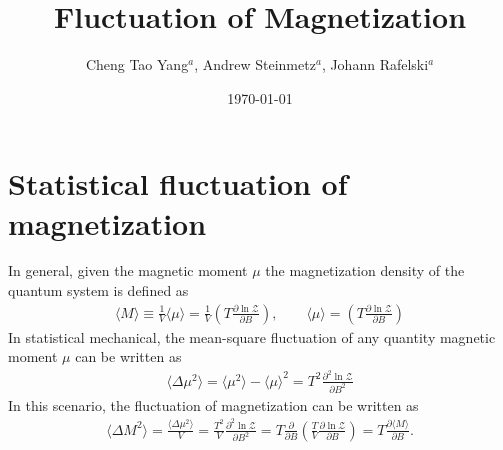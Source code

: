 \documentclass[onecolumn,preprintnumbers,amsmath,amssymb]{revtex4}
\begin{document}
\title{Fluctuation of Magnetization}
\author{Cheng Tao Yang$^a$,  Andrew Steinmetz$^a$, Johann Rafelski$^a$}
\date{\today}


\begin{abstract}
\end{abstract}
\maketitle

\section{Statistical fluctuation of magnetization}
In general, given the magnetic moment $\mu$ the magnetization density of the quantum system is defined as
\begin{align}
\langle M\rangle\equiv\frac{1}{V}\langle \mu\rangle=\frac{1}{V}\left(T\frac{\partial \ln\mathcal Z}{\partial B}\right),\qquad \langle\mu\rangle=\left(T\frac{\partial \ln\mathcal Z}{\partial B}\right)
\end{align}
In statistical mechanical, the mean-square fluctuation of any quantity magnetic moment $\mu$ can be written as
\begin{align}
\langle\Delta \mu^2\rangle=\langle \mu^2\rangle-\langle \mu\rangle^2=T^2\frac{\partial^2 \ln\mathcal Z }{\partial B^2}
\end{align}
In this scenario, the fluctuation of magnetization can be written as
\begin{align}
{\langle\Delta M^2\rangle}=\frac{\langle\Delta \mu^2\rangle}{V}=\frac{T^2}{V}\frac{\partial^2 \ln\mathcal Z }{\partial B^2}=T\frac{\partial}{\partial B}\left(\frac{T}{V}\frac{\partial \ln\mathcal Z}{\partial B}\right)=T\frac{\partial\langle M\rangle}{\partial B}.
\end{align}
\end{document}
